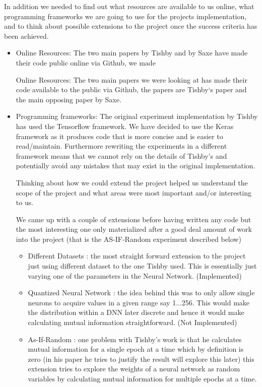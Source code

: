 \documentclass[dissertation.tex]{subfiles}
\begin{document}
In addition we needed to find out what resources are available to us online,
what programming frameworks we are going to use for the projects implementation,
and to think about possible extensions to the project once the success criteria
has been achieved.

\begin{itemize}
  \item{
      Online Resources: The two main papers by Tishby and by Saxe have made
      their code public online via Github, we made 

      Online Resources: The two main papers we were looking at has made their
      code available to the public via Github, the papers are Tishby`s paper and
      the main opposing paper by Saxe.
    }
  \item{
      Programming frameworks: The original experiment implementation by Tishby
      has used the Tensorflow framework. We have decided to use the Keras
      framework as it produces code that is more concise and is easier to
      read/maintain. Furthermore rewriting the experiments in a different
      framework means that we cannot rely on the details of Tishby's and
      potentially avoid any mistakes that may exist in the original
      implementation.
    }
    \begin{item}

      Thinking about how we could extend the project helped us understand the
      scope of the project and what areas were most important and/or interesting
      to us. 

      We came up with a couple of extensions before having written any code but
      the most interesting one only materialized after a good deal amount of
      work into the project (that is the AS-IF-Random experiment described
      below)

      \begin{itemize}
        \item{
            Different Datasets : the most straight forward extension to the
            project just using different dataset to the one Tishby used. This is
            essentially just varying one of the parameters in the Neural
            Network. (Implemented)
          }
        \item{
            Quantized Neural Network : the idea behind this was to only allow
            single neurons to acquire values in a given range say 1...256. This
            would make the distribution within a DNN later discrete and hence it
            would make calculating mutual information straightforward. (Not
            Implemented)
          }
        \item{
            As-If-Random : one problem with Tishby's work is that he calculates
            mutual information for a single epoch at a time which by definition
            is zero (in his paper he tries to justify the result will explore
            this later) this extension tries to explore the weights of a neural
            network as random variables by calculating mutual information for
            multiple epochs at a time.
          }
      \end{itemize}
    \end{item}
\end{itemize}
\end{document}

